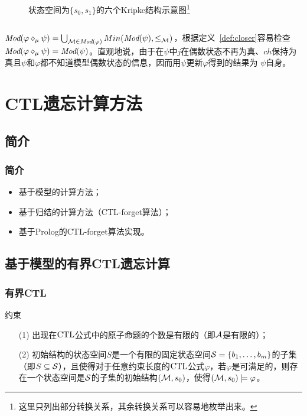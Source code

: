 \documentclass[9pt, CJK]{beamer}
\begin{document}
\begin{frame}
{\begin{example}
\begin{columns}
\begin{figure}
					\caption{{\tiny 状态空间为$\{s_0,s_1\}$的六个Kripke结构示意图}\footnote{这里只列出部分转换关系，其余转换关系可以容易地枚举出来。}}\label{fig:knoup}
				\end{figure}
			\end{columns}
			
			$\textit{Mod}(\varphi \diamond_{\mu} \psi) = \bigcup_{{\cal M}\in \textit{Mod}(\varphi)} Min(\textit{Mod}(\psi), \leq_{{\cal M}})$，根据定义~\ref{def:closer}容易检查$\textit{Mod}(\varphi \diamond_{\mu} \psi) = \textit{Mod}(\psi)$。直观地说，由于在$\psi$中$j$在偶数状态不再为真、$ch$保持为真且$\psi$和$\varphi$都不知道模型偶数状态的信息，因而用$\psi$更新$\varphi$得到的结果为 $\psi$自身。
		\end{example}
	}
\end{frame}

\section{CTL遗忘计算方法}
\subsection{简介}
\begin{frame}
	\frametitle{简介}
	\begin{itemize}
		\item 基于模型的计算方法；
		\item 基于归结的计算方法（CTL-forget算法）；
		\item 基于Prolog的CTL-forget算法实现。
	\end{itemize}
\end{frame}

\subsection{基于模型的有界CTL遗忘计算}
\begin{frame}
	\frametitle{有界CTL}
	\begin{block}{约束}
		\begin{itemize}
			\item[(1)] 出现在$\textrm{CTL}$公式中的原子命题的个数是有限的（即${\cal A}$是有限的）；
			\item[(2)] 初始结构的状态空间$S$是一个有限的固定状态空间${\cal S}=\{b_1,\ldots,b_m\}$的子集（即$S \subseteq {\cal S}$），且使得对于任意约束长度的$\textrm{CTL}$公式$\varphi$，若$\varphi$是可满足的，则存在一个状态空间是${\cal S}$的子集的初始结构$({\cal M},s_0)$，使得$({\cal M},s_0)\models \varphi$。
		\end{itemize}
	\end{block}
\end{frame}
\end{document}
